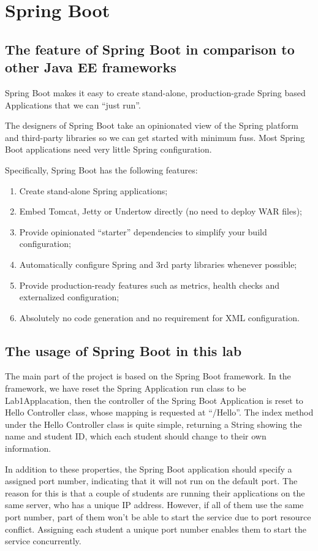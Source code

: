 \documentclass[a4paper]{report}
\begin{document}
\section{Spring Boot}
\subsection{The feature of Spring Boot in comparison to other Java EE frameworks}
Spring Boot makes it easy to create stand-alone, production-grade Spring based Applications that we can ``just run''.
\par
The designers of Spring Boot take an opinionated view of the Spring platform and third-party libraries so we can get started with minimum fuss. Most Spring Boot applications need very little Spring configuration.
\par
Specifically, Spring Boot has the following features:
\begin{enumerate}
  \item Create stand-alone Spring applications;
  \item Embed Tomcat, Jetty or Undertow directly (no need to deploy WAR files);
  \item Provide opinionated ``starter'' dependencies to simplify your build configuration;
  \item Automatically configure Spring and 3rd party libraries whenever possible;
  \item Provide production-ready features such as metrics, health checks and externalized configuration;
  \item Absolutely no code generation and no requirement for XML configuration.
\end{enumerate}
\subsection{The usage of Spring Boot in this lab}
The main part of the project is based on the Spring Boot framework. In the framework, we have reset the Spring Application run class to be Lab1Applacation, then the controller of the Spring Boot Application is reset to Hello Controller class, whose mapping is requested at ``/Hello''. The index method under the Hello Controller class is quite simple, returning a String showing the name and student ID, which each student should change to their own information.
\par
In addition to these properties, the Spring Boot application should specify a assigned port number, indicating that it will not run on the default port. The reason for this is that a couple of students are running their applications on the same server, who has a unique IP address. However, if all of them use the same port number, part of them won't be able to start the service due to port resource conflict. Assigning each student a unique port number enables them to start the service concurrently.
\end{document}
